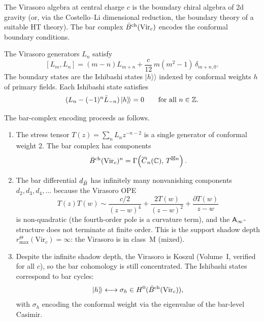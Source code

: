 \begin{construction}
The Virasoro algebra at central charge $c$ is the boundary chiral
algebra of 2d gravity (or, via the Costello--Li dimensional reduction,
the boundary theory of a suitable HT theory). The bar complex
$\bar{B}^{\mathrm{ch}}(\mathrm{Vir}_c)$ encodes the conformal boundary conditions.

The Virasoro generators $L_n$ satisfy
\[
[L_m, L_n] = (m - n) L_{m+n} + \frac{c}{12}\, m(m^2 - 1)\, \delta_{m+n,0}.
\]
The boundary states are the Ishibashi states $|h\rangle\!\rangle$
indexed by conformal weights $h$ of primary fields. Each Ishibashi state
satisfies
\[
(L_n - (-1)^n \bar{L}_{-n})\, |h\rangle\!\rangle = 0
\qquad \text{for all } n \in \mathbb{Z}.
\]

The bar-complex encoding proceeds as follows.
\begin{enumerate}
\item The stress tensor $T(z) = \sum_n L_n z^{-n-2}$ is a single
 generator of conformal weight 2. The bar complex has components
 \[
 \bar{B}^{\mathrm{ch}}(\mathrm{Vir}_c)^n
 = \Gamma\!\left(\overline{C}_n(\mathbb{C}),\, T^{\boxtimes n}\right).
 \]
\item The bar differential $d_{\bar{B}}$ has infinitely many nonvanishing
 components $d_2, d_3, d_4, \ldots$ because the Virasoro OPE
 \[
 T(z) T(w) \sim \frac{c/2}{(z-w)^4}
 + \frac{2T(w)}{(z-w)^2}
 + \frac{\partial T(w)}{z-w}
 \]
 is non-quadratic (the fourth-order pole is a curvature term), and the
 $\mathsf{A}_{\infty}$-structure does not terminate at finite order. This is the
 support shadow depth \(r^\Theta_{\max}(\mathrm{Vir}_c)=\infty\): the Virasoro is in
 class~M (mixed).
\item Despite the infinite shadow depth, the Virasoro is Koszul
 (Volume~I, verified for all $c$), so the bar cohomology is still
 concentrated. The Ishibashi states correspond to bar cycles:
 \[
 |h\rangle\!\rangle
 \longleftrightarrow
 \sigma_h \in H^0(\bar{B}^{\mathrm{ch}}(\mathrm{Vir}_c)),
 \]
 with $\sigma_h$ encoding the conformal weight via the
 eigenvalue of the bar-level Casimir.
\end{enumerate}
\end{construction}

